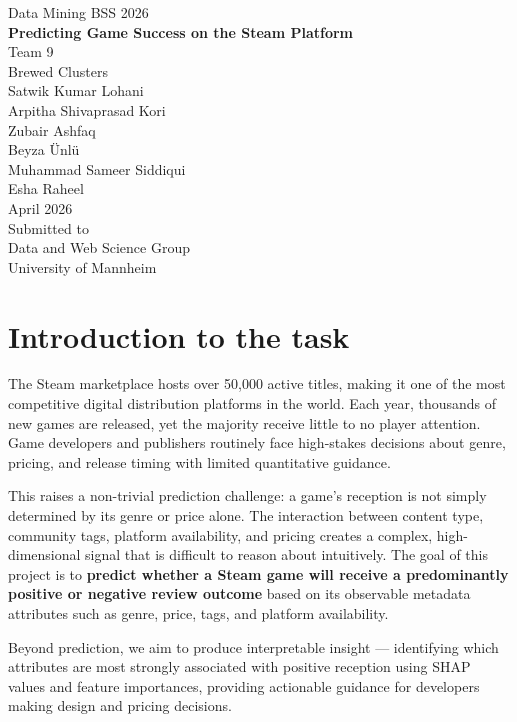 \documentclass[11pt, a4paper]{article}
\begin{document}

\begin{center}
  {\large Data Mining BSS 2026}\\[1.5cm]
  {\LARGE\bfseries Predicting Game Success on the Steam Platform}\\[1cm]
  Team 9\\
  Brewed Clusters\\[0.3cm]
  Satwik Kumar Lohani\\
  Arpitha Shivaprasad Kori\\
  Zubair Ashfaq\\
  Beyza Ünlü\\
  Muhammad Sameer Siddiqui\\
  Esha Raheel\\[0.5cm]
  April 2026\\[2cm]
  \small Submitted to\\
  Data and Web Science Group\\
  University of Mannheim
\end{center}

\newpage

\section{Introduction to the task}

The Steam marketplace hosts over 50{,}000 active titles, making it one of the most
competitive digital distribution platforms in the world. Each year, thousands of new
games are released, yet the majority receive little to no player attention. Game
developers and publishers routinely face high-stakes decisions about genre, pricing,
and release timing with limited quantitative guidance.

This raises a non-trivial prediction challenge: a game's reception is not simply
determined by its genre or price alone. The interaction between content type, community
tags, platform availability, and pricing creates a complex, high-dimensional signal
that is difficult to reason about intuitively. The goal of this project is to
\textbf{predict whether a Steam game will receive a predominantly positive or negative
review outcome} based on its observable metadata attributes such as genre, price,
tags, and platform availability.

Beyond prediction, we aim to produce interpretable insight --- identifying which
attributes are most strongly associated with positive reception using SHAP values
and feature importances, providing actionable guidance for developers making design
and pricing decisions.
\end{document}
